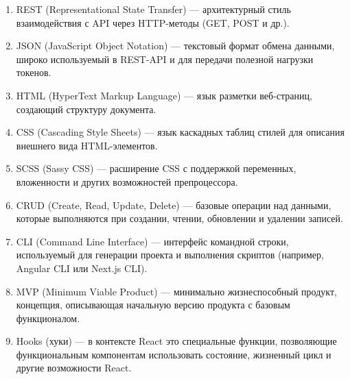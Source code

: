 \begin{enumerate}
  \item REST (Representational State Transfer) — архитектурный стиль взаимодействия с API через HTTP-методы (GET, POST и др.).
  \item JSON (JavaScript Object Notation) — текстовый формат обмена данными, широко используемый в REST-API и для передачи полезной нагрузки токенов.
  \item HTML (HyperText Markup Language) — язык разметки веб-страниц, создающий структуру документа.
  \item CSS (Cascading Style Sheets) — язык каскадных таблиц стилей для описания внешнего вида HTML-элементов.
  \item SCSS (Sassy CSS) — расширение CSS с поддержкой переменных, вложенности и других возможностей препроцессора.
  \item CRUD (Create, Read, Update, Delete) — базовые операции над данными, которые выполняются при создании, чтении, обновлении и удалении записей.
  \item CLI (Command Line Interface) — интерфейс командной строки, используемый для генерации проекта и выполнения скриптов (например, Angular CLI или Next.js CLI).
  \item MVP (Minimum Viable Product) — минимально жизнеспособный продукт, концепция, описывающая начальную версию продукта с базовым функционалом.
  \item Hooks (хуки) — в контексте React это специальные функции, позволяющие функциональным компонентам использовать состояние, жизненный цикл и другие возможности React.
\end{enumerate}